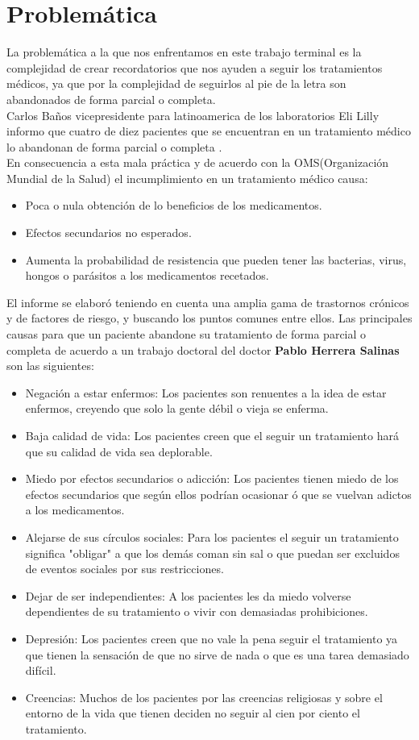 \section{Problemática}

La problemática a la que nos enfrentamos en este trabajo terminal es la complejidad de crear recordatorios que nos ayuden a seguir los tratamientos médicos, ya que por la complejidad de seguirlos al pie de la letra son abandonados de forma parcial o completa.\\
Carlos Baños vicepresidente para latinoamerica de los laboratorios Eli Lilly informo que cuatro de diez pacientes que se encuentran en un tratamiento médico lo abandonan de forma parcial o completa \cite{Referencia1}.\\
En consecuencia a esta mala práctica y de acuerdo con la OMS(Organización Mundial de la Salud)\cite{Referencia2} el incumplimiento en un tratamiento médico causa:
\begin{itemize}
	\item Poca o nula obtención de lo beneficios de los medicamentos.
	\item Efectos secundarios no esperados.
	\item Aumenta la probabilidad de resistencia que pueden tener las bacterias, virus, hongos o parásitos a los medicamentos recetados.
\end{itemize}
El informe se elaboró teniendo en cuenta una amplia gama de trastornos crónicos y de factores de riesgo, y buscando los puntos comunes entre ellos\cite{Referencia3}.
Las principales causas para que un paciente abandone su tratamiento de forma parcial o completa de acuerdo a un trabajo doctoral del doctor \textbf{Pablo Herrera Salinas}\cite{Referencia4} son las siguientes:
\begin{itemize}
	\item Negación a estar enfermos: Los pacientes son renuentes a la idea de estar enfermos, creyendo que solo la gente débil o vieja se enferma.
	\item Baja calidad de vida: Los pacientes creen que el seguir un tratamiento hará que su calidad de vida sea deplorable.
	\item Miedo por efectos secundarios o adicción: Los pacientes tienen miedo de los efectos secundarios que según ellos podrían ocasionar ó que se vuelvan adictos a los medicamentos.
	\item Alejarse de sus círculos sociales: Para los pacientes el seguir un tratamiento significa "obligar" a que los demás coman sin sal o que puedan ser excluidos de eventos sociales por sus restricciones.
	\item Dejar de ser independientes: A los pacientes les da miedo volverse dependientes de su tratamiento o vivir con demasiadas prohibiciones.
	\item Depresión: Los pacientes creen que no vale la pena seguir el tratamiento ya que tienen la sensación de que no sirve de nada o que es una tarea demasiado difícil.
	\item Creencias: Muchos de los pacientes por las creencias religiosas y sobre el entorno de la vida que tienen deciden no seguir al cien por ciento el tratamiento.
\end{itemize}

